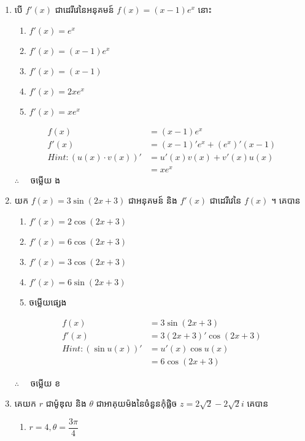 \documentclass[a4paper,12pt]{article}
\begin{document}
\begin{enumerate}[m]
	\item បើ $f'(x)$ ជាដេរីវេនៃអនុគមន៍ $f(x)=\left(x-1\right)e^x$ នោះ
	\begin{enumerate}[k,3]
		\item $f'(x)=e^x$
		\item $f'(x)=\left(x-1\right)e^x$
		\item $f'(x)=\left(x-1\right)$
		\item $f'(x)=2xe^x$
		\item $f'(x)=xe^x$
	\end{enumerate}
	\answer
	\begin{center}
		\begin{align*}
		f(x)&=\left(x-1\right)e^x\\
		f'(x)&=\left(x-1\right)'e^x+\left(e^x\right)'\left(x-1\right)\\
		Hint: \left(u(x)\cdot v(x)\right)'&=u'(x)v(x)+v'(x)u(x)\\
		&=xe^x
		\end{align*}
		$\therefore \quad$ \kml ចម្លើយ \kbk ង
	\end{center}
	{\color{blue}\hrulefill}
	\item យក $f(x)=3\sin\left(2x+3\right)$ ជាអនុគមន៍ និង $f'(x)$ ជាដេរីវេនៃ $f(x)$ ។ គេបាន
		\begin{enumerate}[k,3]
			\item $f'(x)=2\cos\left(2x+3\right)$
			\item $f'(x)=6\cos\left(2x+3\right)$
			\item $f'(x)=3\cos\left(2x+3\right)$
			\item $f'(x)=6\sin\left(2x+3\right)$
			\item ចម្លើយផ្សេង
		\end{enumerate}
		\answer
			\begin{align*}
				f(x)&=3\sin\left(2x+3\right)\\
				f'(x)&=3\left(2x+3\right)'\cos\left(2x+3\right)\\
				Hint: \left(\sin u(x)\right)'&=u'(x)\cos u(x)\\
				&=6\cos\left(2x+3\right)
			\end{align*}
			\begin{center}
				$\therefore \quad$ \kml ចម្លើយ \kbk ខ
			\end{center}
		{\color{blue}\hrulefill}
	\item គេយក $r$ ជាម៉ូឌុល និង $\theta$ ជាអាគុយម៉ងនៃចំនួនកុំផ្លិច $z=2\sqrt{2}-2\sqrt{2}i$ គេបាន
		\begin{enumerate}[k,3]
			\item $r=4,\theta=\dfrac{3\pi}{4}$

\end{enumerate}
\end{enumerate}
\end{document}
